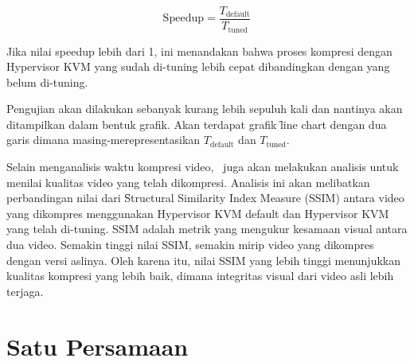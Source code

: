 \[ \mathrm{Speedup} = \frac{T_{\mathrm{default}}}{T_{\mathrm{tuned}}} \]

Jika nilai speedup lebih dari 1, ini menandakan bahwa proses kompresi dengan Hypervisor KVM yang sudah di-tuning lebih cepat dibandingkan dengan yang belum di-tuning. 

Pengujian akan dilakukan sebanyak kurang lebih sepuluh kali dan nantinya akan ditampilkan dalam bentuk grafik. Akan terdapat grafik \f{line chart} dengan dua garis dimana masing-merepresentasikan $T_{\mathrm{default}}$ dan $T_{\mathrm{tuned}}$.

Selain menganalisis waktu kompresi video, \saya\ juga akan melakukan analisis untuk menilai kualitas video yang telah dikompresi. Analisis ini akan melibatkan perbandingan nilai dari \f{Structural Similarity Index Measure} (SSIM) antara video yang dikompres menggunakan Hypervisor KVM default dan Hypervisor KVM yang telah di-tuning. SSIM adalah metrik yang mengukur kesamaan visual antara dua video. Semakin tinggi nilai SSIM, semakin mirip video yang dikompres dengan versi aslinya. Oleh karena itu, nilai SSIM yang lebih tinggi menunjukkan kualitas kompresi yang lebih baik, dimana integritas visual dari video asli lebih terjaga.

\iffalse
\section{Satu Persamaan}

